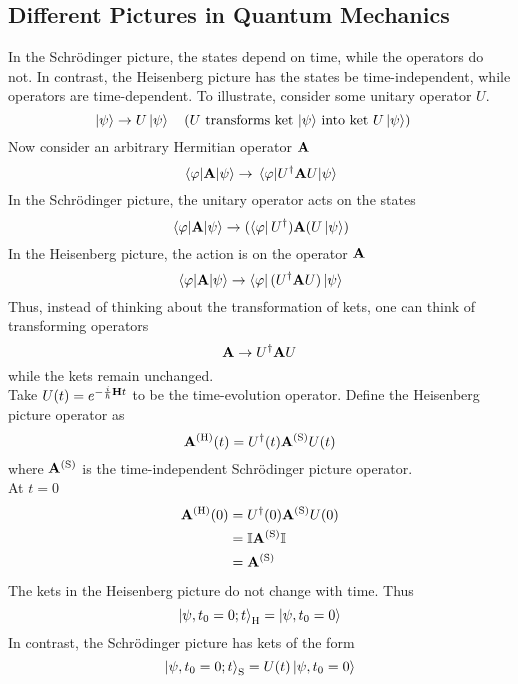 \documentclass[12pt,a4paper,titlepage]{article}
\newcommand{\trm}[1]{\textrm{#1}} %
\begin{document}
\subsection{Different Pictures in Quantum Mechanics}
In the Schr\"{o}dinger picture, the states depend on time, while the operators do not. In contrast, the Heisenberg picture has the states be time-independent, while operators are time-dependent. To illustrate, consider some unitary operator $U$.
\begin{equation}
\ket{\psi}\rightarrow U\ket{\psi}\qq{($U$ transforms ket $\ket{\psi}$ into ket $U\ket{\psi}$)}
\end{equation}
Now consider an arbitrary Hermitian operator $\vb{A}$
\begin{equation}
\mel{\varphi}{\vb{A}}{\psi}\rightarrow\mel{\varphi}{U^{\dagger}\vb{A}U}{\psi}
\end{equation}
In the Schr\"{o}dinger picture, the unitary operator acts on the states
\begin{equation}
\mel{\varphi}{\vb{A}}{\psi}\rightarrow(\bra{\varphi}U^{\dagger})\vb{A}(U\ket{\psi})
\end{equation}
In the Heisenberg picture, the action is on the operator $\vb{A}$
\begin{equation}
\mel{\varphi}{\vb{A}}{\psi}\rightarrow\bra{\varphi}(U^{\dagger}\vb{A}U)\ket{\psi}
\end{equation}
Thus, instead of thinking about the transformation of kets, one can think of transforming operators
\begin{equation}
\vb{A}\rightarrow U^{\dagger}\vb{A}U
\end{equation}
while the kets remain unchanged.\\

Take $U(t)=e^{-\frac{i}{\hbar}\vb{H}t}$ to be the time-evolution operator. Define the Heisenberg picture operator as
\begin{equation}
\vb{A}^{(\trm{H})}(t)=U^{\dagger}(t)\vb{A}^{(\trm{S})}U(t)
\end{equation}
where $\vb{A}^{\trm{(S)}}$ is the time-independent Schr\"{o}dinger picture operator.\\

At $t=0$
\begin{equation}
\begin{aligned}
\vb{A}^{(\trm{H})}(0)&=U^{\dagger}(0)\vb{A}^{(\trm{S})}U(0)\\
&=\mathbb{I}\vb{A}^{\trm{(S)}}\mathbb{I}\\
&=\vb{A}^{\trm{(S)}}
\end{aligned}
\end{equation}
The kets in the Heisenberg picture do not change with time. Thus
\begin{equation}
\ket{\psi,t_{0}=0;t}_{\trm{H}}=\ket{\psi,t_{0}=0}
\end{equation}
In contrast, the Schr\"{o}dinger picture has kets of the form
\begin{equation}
\ket{\psi,t_{0}=0;t}_{\trm{S}}=U(t)\ket{\psi,t_{0}=0}
\end{equation}
\end{document}
